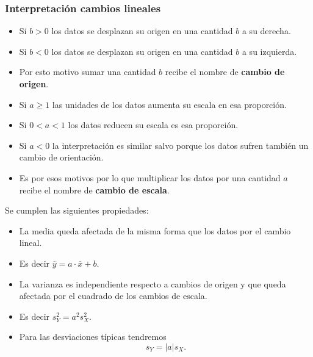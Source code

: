 \begin{frame}
\frametitle{Interpretación cambios lineales}
\begin{itemize}
\item Si $b>0$ los datos se desplazan su origen en una cantidad $b$ a su derecha.
\item Si $b<0$ los datos se desplazan su origen en una cantidad $b$ a su izquierda.
\item Por esto motivo sumar una cantidad $b$ recibe el nombre de \textbf{cambio de origen}.
\item Si $a\geq 1$ las unidades de los datos aumenta su escala en esa proporción.
\item Si $0<a<1$ los datos reducen su escala es esa proporción.
\item Si $a<0$ la interpretación es similar salvo porque los datos sufren también un cambio de orientación.
\item Es por esos motivos por lo que multiplicar los datos por una cantidad $a$ recibe el nombre de \textbf{cambio de escala}.
\end{itemize}
\end{frame}


\begin{frame}
Se cumplen  las siguientes propiedades:
\begin{itemize}
\item La media queda afectada de   la misma forma que los datos por el cambio lineal.
\item Es decir $\overline{y}= a \cdot \overline{x}+b$.
\item La varianza es independiente respecto a  cambios de origen y que
queda afectada por el cuadrado de los cambios de escala.
\item Es decir  $s_Y^2 = a^2 s_X^2.$
\item Para las desviaciones típicas tendremos $$s_Y=|a| s_X.$$
\end{itemize}
\end{frame}


% 



